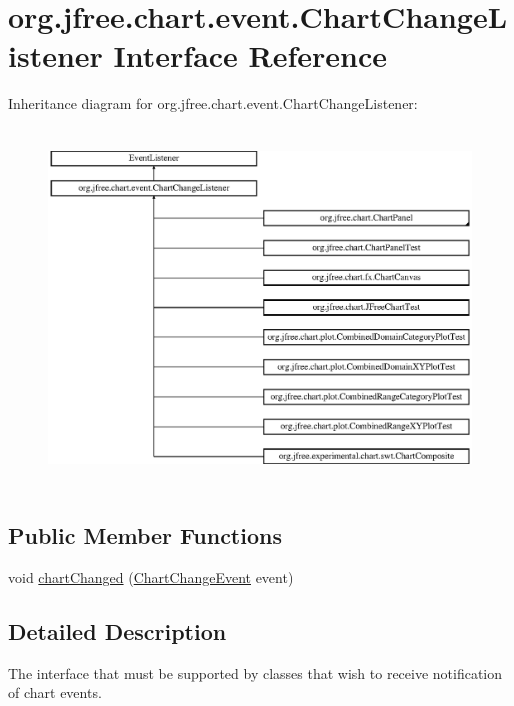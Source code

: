 \hypertarget{interfaceorg_1_1jfree_1_1chart_1_1event_1_1_chart_change_listener}{}\section{org.\+jfree.\+chart.\+event.\+Chart\+Change\+Listener Interface Reference}
\label{interfaceorg_1_1jfree_1_1chart_1_1event_1_1_chart_change_listener}
Inheritance diagram for org.\+jfree.\+chart.\+event.\+Chart\+Change\+Listener\+:\begin{figure}[H]
\begin{center}
\leavevmode
\includegraphics[height=9.506172cm]{interfaceorg_1_1jfree_1_1chart_1_1event_1_1_chart_change_listener}
\end{center}
\end{figure}
\subsection*{Public Member Functions}
\begin{DoxyCompactItemize}
\item 
void \mbox{\hyperlink{interfaceorg_1_1jfree_1_1chart_1_1event_1_1_chart_change_listener_ac4ad92c4f9cc7be26964dab79d882bee}{chart\+Changed}} (\mbox{\hyperlink{classorg_1_1jfree_1_1chart_1_1event_1_1_chart_change_event}{Chart\+Change\+Event}} event)
\end{DoxyCompactItemize}


\subsection{Detailed Description}
The interface that must be supported by classes that wish to receive notification of chart events. 

